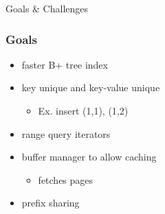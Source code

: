 \documentclass{beamer}
\begin{document}
  \begin{section}{Goals \& Challenges}
    \begin{frame}
      \frametitle{Goals}
        \begin{itemize}
          \item faster B+ tree index
          \pause
          \item key unique and key-value unique
          \begin{itemize}
            \item Ex. insert (1,1), (1,2)
          \end{itemize}
          \pause
          \item range query iterators
          \pause
          \item buffer manager to allow caching
          \begin{itemize}
            \item fetches pages 
          \end{itemize}
          \pause
          \item prefix sharing
        \end{itemize}
    \end{frame}


\end{section}
\end{document}
